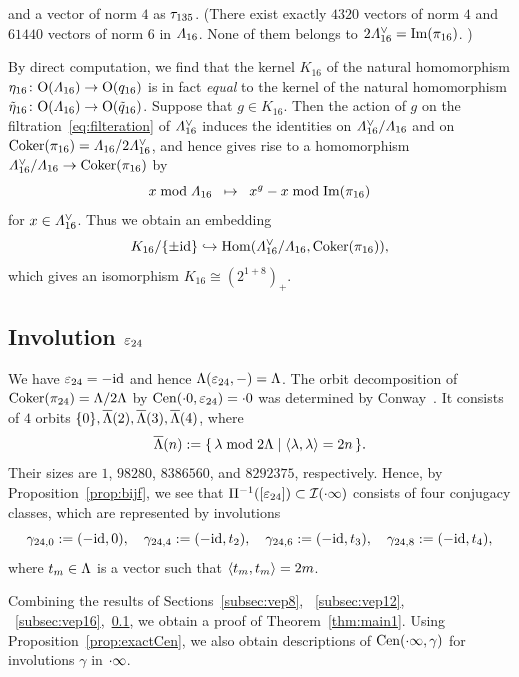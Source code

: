 \documentclass{amsart} %
\begin{document}
 and a vector of norm $4$ as $ \tau_{135}$.
%
(There exist exactly $4320$ vectors of norm $4$ 
and $61440$ vectors of norm $6$ 
in $\varLambda_{16}$. 
None of them belongs to $2\varLambda_{16}^{\vee}=\operatorname{Im}(\pi_{16})$. )
%
\begin{remark}\label{rem:K16}
By direct computation, 
we find that 
the kernel $K_{16}$ of  the natural homomorphism 
$\eta_{16}\colon\mathord{\mathrm{O}}(\varLambda_{16})\to \mathord{\mathrm{O}}(q_{16})$
is in fact \emph{equal} to the kernel of 
the natural homomorphism 
$\tilde{\eta}_{16}\colon \mathord{\mathrm{O}}(\varLambda_{16})\to \mathord{\mathrm{O}}(\tilde{q}_{16})$.
Suppose that $g\in K_{16}$.
Then 
the action of $g$ on
the filtration~\eqref{eq:filteration} of $\varLambda_{16}^{\vee}$
induces the identities on 
 $\varLambda_{16}^{\vee}/\varLambda_{16}$ and on $\operatorname{Coker} (\pi_{16})=\varLambda_{16}/2\varLambda_{16}^{\vee}$, 
and hence gives rise to a homomorphism $\varLambda_{16}^{\vee}/\varLambda_{16}\to \operatorname{Coker} (\pi_{16})$
by 
\[ x \bmod \varLambda_{16} \;\;\mapsto \;\; x^g- x \bmod \operatorname{Im}(\pi_{16})
\]
for $x\in \varLambda_{16}^{\vee}$.
Thus we obtain an embedding
\[
K_{16}/\{\pm \mathord{\mathrm{id}}\}\hookrightarrow \operatorname{Hom}(\varLambda_{16}^{\vee}/\varLambda_{16}, \operatorname{Coker} (\pi_{16})), 
\]
which gives an isomorphism $K_{16}\cong (2^{1+8})_{+}$.
\end{remark}
%
%
\subsection{Involution $\varepsilon_{24}$}\label{subsec:vep24}
%
We have $\varepsilon_{24}=-\mathord{\mathrm{id}}$ and hence $\Lambda(\varepsilon_{24}, -)=\Lambda$.
The orbit decomposition of 
$\operatorname{Coker}(\pi_{24})=\Lambda/2\Lambda$ by $\mathrm{Cen}(\cdot 0, \varepsilon_{24})=\cdot 0$ 
was determined by  
Conway~\cite[Chapter 10, Section 3.3]{theCSbook}.
It consists of $4$ orbits $\{0\}, \overline{\Lambda}(2), \overline{\Lambda}(3), \overline{\Lambda}(4)$, where 
\[
 \overline{\Lambda}(n):=\{\,{\lambda\bmod 2\Lambda}\mid {\langle \lambda, \lambda \rangle=2n} \,\}.
\]
Their sizes are $1$, $98280$, $8386560$, and $8292375$, respectively.
Hence, by Proposition~\ref{prop:bijf}, we see that 
$\Pi^{-1} ([\varepsilon_{24}])\subset \mathord{\mathcal{I}}(\cdot \infty)$ consists of four conjugacy classes,
 which are 
 represented by involutions
 \[
\gamma_{24, 0}:=(-\mathord{\mathrm{id}}, 0),
\quad
\gamma_{24, 4}:=(-\mathord{\mathrm{id}}, t_2),
\quad
\gamma_{24, 6}:=(-\mathord{\mathrm{id}}, t_3),
\quad
\gamma_{24, 8}:=(-\mathord{\mathrm{id}}, t_4),
 \]
where $t_m\in \Lambda$ is a vector such that
$\langle  t_m, t_m \rangle=2m$.
%
\par
\medskip
Combining the results of Sections~\ref{subsec:vep8}, ~\ref{subsec:vep12}, ~\ref{subsec:vep16},~\ref{subsec:vep24},
we obtain a proof of Theorem~\ref{thm:main1}.
Using Proposition~\ref{prop:exactCen}, we also obtain descriptions of $\mathrm{Cen}(\cdot \infty, \gamma)$
for involutions $\gamma$ in $\cdot \infty$.
%
%
\end{document}
